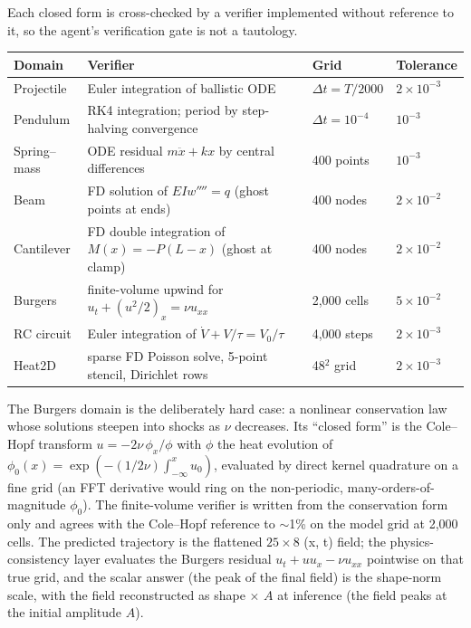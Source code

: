 \documentclass[11pt,a4paper]{article}
\begin{document}
Each closed form is cross-checked by a verifier implemented without
reference to it, so the agent's verification gate is not a tautology.

\begin{center}
\small
\begin{tabular}{llll}
\toprule
Domain & Verifier & Grid & Tolerance \\
\midrule
Projectile & Euler integration of ballistic ODE & $\Delta t = T/2000$ & $2\times10^{-3}$ \\
Pendulum & RK4 integration; period by step-halving convergence & $\Delta t = 10^{-4}$ & $10^{-3}$ \\
Spring--mass & ODE residual $m\ddot x + kx$ by central differences & 400 points & $10^{-3}$ \\
Beam & FD solution of $EI w'''' = q$ (ghost points at ends) & 400 nodes & $2\times10^{-2}$ \\
Cantilever & FD double integration of $M(x) = -P(L-x)$ (ghost at clamp) & 400 nodes & $2\times10^{-2}$ \\
Burgers & finite-volume upwind for $u_t + (u^2/2)_x = \nu u_{xx}$ & 2{,}000 cells & $5\times10^{-2}$ \\
RC circuit & Euler integration of $\dot V + V/\tau = V_0/\tau$ & 4{,}000 steps & $2\times10^{-3}$ \\
Heat2D & sparse FD Poisson solve, 5-point stencil, Dirichlet rows & 48$^2$ grid & $2\times10^{-3}$ \\
\bottomrule
\end{tabular}
\end{center}

The Burgers domain is the deliberately hard case: a nonlinear conservation
law whose solutions steepen into shocks as $\nu$ decreases. Its ``closed
form'' is the Cole--Hopf transform $u = -2\nu\,\phi_x/\phi$ with $\phi$ the
heat evolution of $\phi_0(x)=\exp(-(1/2\nu)\int_{-\infty}^{x}u_0)$, evaluated
by direct kernel quadrature on a fine grid (an FFT derivative would ring on
the non-periodic, many-orders-of-magnitude $\phi_0$). The finite-volume
verifier is written from the conservation form only and agrees with the
Cole--Hopf reference to $\sim$1\% on the model grid at 2{,}000 cells. The
predicted trajectory is the flattened $25\times8$ (x, t) field; the
physics-consistency layer evaluates the Burgers residual
$u_t + u u_x - \nu u_{xx}$ pointwise on that true grid, and the scalar answer
(the peak of the final field) is the shape-norm scale, with the field
reconstructed as shape $\times$ $A$ at inference (the field peaks at the
initial amplitude $A$).
\end{document}
